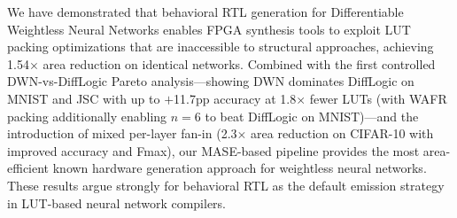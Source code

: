 \documentclass[conference]{IEEEtran}
\begin{document}
We have demonstrated that behavioral RTL generation for Differentiable Weightless Neural Networks enables FPGA synthesis tools to exploit LUT packing optimizations that are inaccessible to structural approaches, achieving 1.54$\times$ area reduction on identical networks.
Combined with the first controlled DWN-vs-DiffLogic Pareto analysis---showing DWN dominates DiffLogic on MNIST and JSC with up to $+$11.7pp accuracy at 1.8$\times$ fewer LUTs (with WAFR packing additionally enabling $n{=}6$ to beat DiffLogic on MNIST)---and the introduction of mixed per-layer fan-in (2.3$\times$ area reduction on CIFAR-10 with improved accuracy and Fmax), our MASE-based pipeline provides the most area-efficient known hardware generation approach for weightless neural networks.
These results argue strongly for behavioral RTL as the default emission strategy in LUT-based neural network compilers.


\balance


\end{document}
